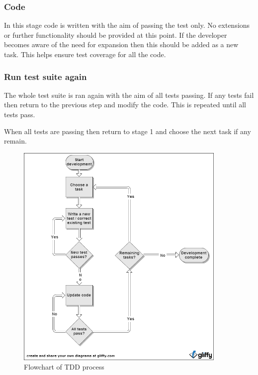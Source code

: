 \subsubsection*{Code}

In this stage code is written with the aim of passing the test only. No extensions or further functionality should be provided at this point. If the developer becomes aware of the need for expansion then this should be added as a new task. This helps ensure test coverage for all the code.

\subsubsection*{Run test suite again}

The whole test suite is ran again with the aim of all tests passing. If any tests fail then return to the previous step and modify the code. This is repeated until all tests pass.

When all tests are passing then return to stage 1 and choose the next task if any remain.

\begin{figure}[h]
\centering
\includegraphics[width=0.9\textwidth]{Images/TDD.png}
\caption{Flowchart of TDD process}
\label{fig:TDD_flowchart}
\end{figure}

